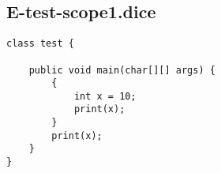 \subsection{E-test-scope1.dice}
\begin{verbatim}
class test {

	public void main(char[][] args) {
		{
			int x = 10;
			print(x);
		}
		print(x);
	}
}
\end{verbatim}
